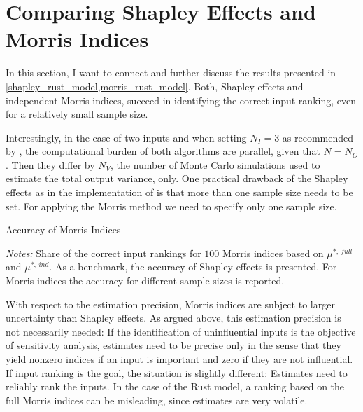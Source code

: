 \section{Comparing Shapley Effects and Morris Indices} \label{comparison}

In this section, I want to connect and further discuss the results presented in \cref{shapley_rust_model,morris_rust_model}. Both, Shapley effects and independent Morris indices, succeed in identifying the correct input ranking, even for a relatively small sample size.

Interestingly, in the case of two inputs and when setting $N_I = 3$ as recommended
by \citet{SNS16}, the computational burden of both algorithms are parallel, given that $N = N_O$. Then they differ by $N_V$, the number of Monte Carlo simulations used to estimate the total output variance, only. One practical drawback
of the Shapley effects as in the implementation of \citet{SNS16} is that more than one sample size needs to be set. For applying the Morris method we need to specify only one sample size.

\begin{table}
	\centering
	\caption{Accuracy of Morris Indices}
	\label{accuracy}
	\begin{threeparttable}
	\centering
	
	\begin{tablenotes}
	\small
	\item \textit{Notes:} Share of the correct input rankings for $100$ Morris indices based on $\mu^{\ast,\ full}$ and $\mu^{\ast,\ ind}$. As a benchmark, the accuracy of Shapley effects is presented. For Morris indices the accuracy for different sample sizes is reported.
	\end{tablenotes}
	\end{threeparttable}
\end{table}

With respect to the estimation precision, Morris indices are subject to larger uncertainty
than Shapley effects. As argued above, this estimation precision is not necessarily needed: If
the identification of uninfluential inputs is the objective of sensitivity analysis, estimates need to be precise
only in the sense that they yield nonzero indices if an input is important and zero if they
are not influential. If input ranking is the goal, the situation is slightly different: Estimates need to reliably rank the inputs.
In the case of the Rust model, a ranking based on the full Morris indices can be misleading, since estimates are very volatile.

